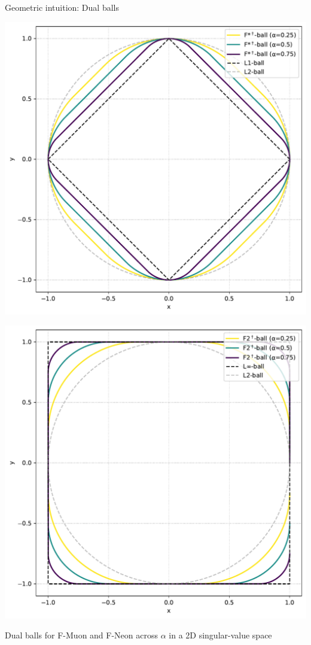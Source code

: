 \documentclass[aspectratio=169]{beamer}
\begin{document}
\begin{frame}{Geometric intuition: Dual balls}
    \centering
    \begin{minipage}{0.48\textwidth}
        \includegraphics[height=0.75\textheight,keepaspectratio]{fstardualball.pdf}
    \end{minipage}\hfill
    \begin{minipage}{0.48\textwidth}
        \includegraphics[height=0.75\textheight,keepaspectratio]{ftwodualball.pdf}
    \end{minipage}
    
    \vspace{0.3em}
    \footnotesize Dual balls for F-Muon and F-Neon across \(\alpha\) in a 2D singular-value space
    \end{frame}
\end{document}
